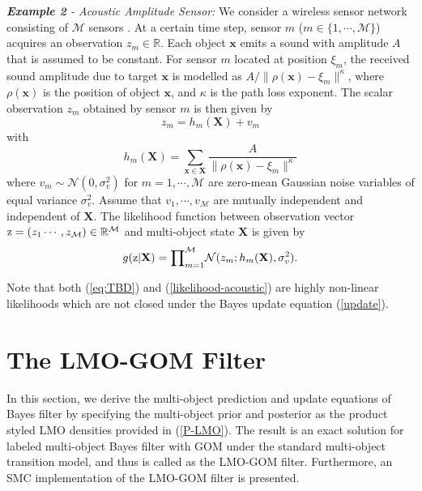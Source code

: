 \documentclass[journal]{IEEEtran}
\newcommand{\bX}{{\mathbf X}}
\newcommand{\bx}{{\mathbf x}}
\begin{document}
{\noindent \textit{\textbf{Example 2} - Acoustic Amplitude Sensor:}
We consider a wireless sensor network consisting of $\mathcal{M}$ sensors \cite{refr:amplitude}. At a certain time step,   sensor $m$ ($m\in \{1,\cdots,\mathcal{M}\}$) acquires an observation $z_{m}\in\mathbb{R}$. 
Each object  $\bx$ emits a sound with amplitude $A$ that is assumed to be constant. For  sensor $m$ located at  position $\xi_{m}$, the received sound amplitude due to 
target $\bx$ is modelled as $A/\|\rho(\bx)-\xi_{m}\|^{\kappa}$, where   $\rho(\bx)$ is the position of object $\bx$,  and ${\kappa}$ is the path loss exponent. The scalar observation $z_{m}$ obtained by sensor $m$  is then given by
\begin{equation}\label{acoustic amplitude model}
z_{m}=h_{m}(\bX)+v_{m}
\end{equation}
with
\begin{equation}\label{acoustic amplitude model-parameter}
h_{m}(\bX)={\sum}_{\bx\in\bX}\frac{A}{\|\rho(\bx)-\xi_{m}\|^{\kappa}}
\end{equation}
where $v_{m}\sim\mathcal{N}(0,\sigma_{v}^{2})$ for $m=1,\cdots,\mathcal{M}$ are zero-mean Gaussian  noise variables of equal variance $\sigma_{v}^{2}$. Assume that $v_{1},\cdots,v_{\mathcal{M}}$ are mutually independent and independent of $\bX$. The likelihood function  between  observation vector $\textmd{z}=(z_{1}\cdots,z_{\mathcal{M}})\in\mathbb{R}^{\mathcal{M}}$ and  multi-object state $\bX$ is given by
\begin{equation}\label{likelihood-acoustic}
g(\textmd{z}|\bX)={\prod}_{m=1}^{\mathcal{M}} \mathcal{N}(z_{m};h_{m}(\bX),\sigma^{2}_{v}).
\end{equation}





Note that both (\ref{eq:TBD}) and  (\ref{likelihood-acoustic}) are highly non-linear likelihoods which are not closed under the Bayes  update equation (\ref{update}).




\section{The LMO-GOM Filter}\label{chp:4}
In this section, we derive the multi-object prediction and update equations of Bayes filter by specifying the multi-object prior and posterior as the product styled LMO densities provided in (\ref{P-LMO}). The result is an exact solution for labeled multi-object  Bayes filter with GOM under the standard multi-object transition model, and thus is called as  the  LMO-GOM filter. Furthermore, an SMC implementation of the LMO-GOM filter is presented. 
}
\end{document}
